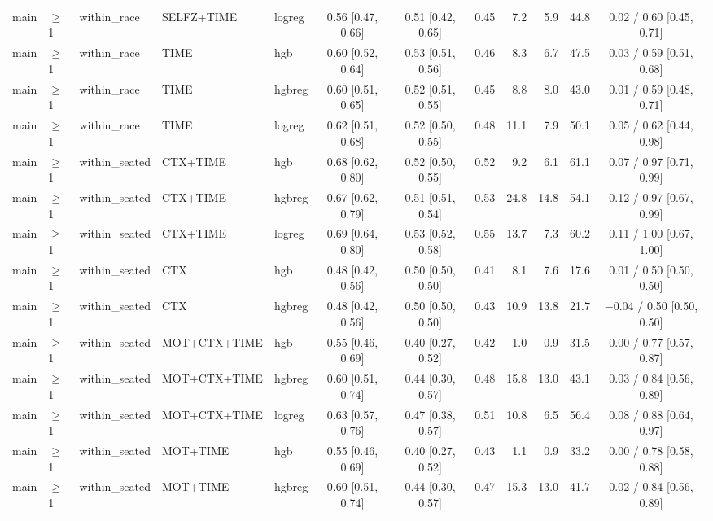 \begin{longtable}{@{}lllllcccrrrc@{}}
main & $\geq$1 & within\_race & SELFZ+TIME & logreg & 0.56 [0.47, 0.66] & 0.51 [0.42, 0.65] & 0.45 & 7.2 & 5.9 & 44.8 & 0.02 / 0.60 [0.45, 0.71] \\
main & $\geq$1 & within\_race & TIME & hgb & 0.60 [0.52, 0.64] & 0.53 [0.51, 0.56] & 0.46 & 8.3 & 6.7 & 47.5 & 0.03 / 0.59 [0.51, 0.68] \\
main & $\geq$1 & within\_race & TIME & hgbreg & 0.60 [0.51, 0.65] & 0.52 [0.51, 0.55] & 0.45 & 8.8 & 8.0 & 43.0 & 0.01 / 0.59 [0.48, 0.71] \\
main & $\geq$1 & within\_race & TIME & logreg & 0.62 [0.51, 0.68] & 0.52 [0.50, 0.55] & 0.48 & 11.1 & 7.9 & 50.1 & 0.05 / 0.62 [0.44, 0.98] \\
main & $\geq$1 & within\_seated & CTX+TIME & hgb & 0.68 [0.62, 0.80] & 0.52 [0.50, 0.55] & 0.52 & 9.2 & 6.1 & 61.1 & 0.07 / 0.97 [0.71, 0.99] \\
main & $\geq$1 & within\_seated & CTX+TIME & hgbreg & 0.67 [0.62, 0.79] & 0.51 [0.51, 0.54] & 0.53 & 24.8 & 14.8 & 54.1 & 0.12 / 0.97 [0.67, 0.99] \\
main & $\geq$1 & within\_seated & CTX+TIME & logreg & 0.69 [0.64, 0.80] & 0.53 [0.52, 0.58] & 0.55 & 13.7 & 7.3 & 60.2 & 0.11 / 1.00 [0.67, 1.00] \\
main & $\geq$1 & within\_seated & CTX & hgb & 0.48 [0.42, 0.56] & 0.50 [0.50, 0.50] & 0.41 & 8.1 & 7.6 & 17.6 & 0.01 / 0.50 [0.50, 0.50] \\
main & $\geq$1 & within\_seated & CTX & hgbreg & 0.48 [0.42, 0.56] & 0.50 [0.50, 0.50] & 0.43 & 10.9 & 13.8 & 21.7 & $-$0.04 / 0.50 [0.50, 0.50] \\
main & $\geq$1 & within\_seated & MOT+CTX+TIME & hgb & 0.55 [0.46, 0.69] & 0.40 [0.27, 0.52] & 0.42 & 1.0 & 0.9 & 31.5 & 0.00 / 0.77 [0.57, 0.87] \\
main & $\geq$1 & within\_seated & MOT+CTX+TIME & hgbreg & 0.60 [0.51, 0.74] & 0.44 [0.30, 0.57] & 0.48 & 15.8 & 13.0 & 43.1 & 0.03 / 0.84 [0.56, 0.89] \\
main & $\geq$1 & within\_seated & MOT+CTX+TIME & logreg & 0.63 [0.57, 0.76] & 0.47 [0.38, 0.57] & 0.51 & 10.8 & 6.5 & 56.4 & 0.08 / 0.88 [0.64, 0.97] \\
main & $\geq$1 & within\_seated & MOT+TIME & hgb & 0.55 [0.46, 0.69] & 0.40 [0.27, 0.52] & 0.43 & 1.1 & 0.9 & 33.2 & 0.00 / 0.78 [0.58, 0.88] \\
main & $\geq$1 & within\_seated & MOT+TIME & hgbreg & 0.60 [0.51, 0.74] & 0.44 [0.30, 0.57] & 0.47 & 15.3 & 13.0 & 41.7 & 0.02 / 0.84 [0.56, 0.89] \\

\end{longtable}
